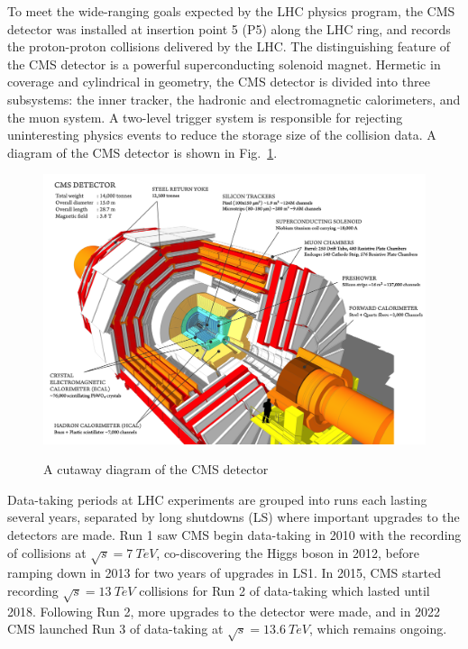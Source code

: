 

To meet the wide-ranging goals expected by the LHC physics program, the CMS detector \cite{CMSTDR} was installed at insertion point 5 (P5) along the LHC ring, and records the proton-proton collisions delivered by the LHC. The distinguishing feature of the CMS detector is a powerful superconducting solenoid magnet. Hermetic in coverage and cylindrical in geometry, the CMS detector is divided into three subsystems: the inner tracker, the hadronic and electromagnetic calorimeters, and the muon system. A two-level trigger system is responsible for rejecting uninteresting physics events to reduce the storage size of the collision data. A diagram of the CMS detector is shown in Fig.~\ref{fig:CMSDiagram}.

\begin{figure}[H]
    \centering
    {\includegraphics[width=1\textwidth]{Images/CMS/CMSDiagram.png}}
    \caption{A cutaway diagram of the CMS detector}
    \label{fig:CMSDiagram}
\end{figure}

Data-taking periods at LHC experiments are grouped into runs each lasting several years, separated by long shutdowns (LS) where important upgrades to the detectors are made. Run 1 saw CMS begin data-taking in 2010 with the recording of collisions at $\sqrt{s}=\SI{7}{TeV}$, co-discovering the Higgs boson in 2012, before ramping down in 2013 for two years of upgrades in LS1. In 2015, CMS started recording $\sqrt{s}=\SI{13}{TeV}$ collisions for Run 2 of data-taking which lasted until 2018. Following Run 2, more upgrades to the detector were made, and in 2022 CMS launched Run 3 of data-taking at $\sqrt{s}=\SI{13.6}{TeV}$, which remains ongoing.


